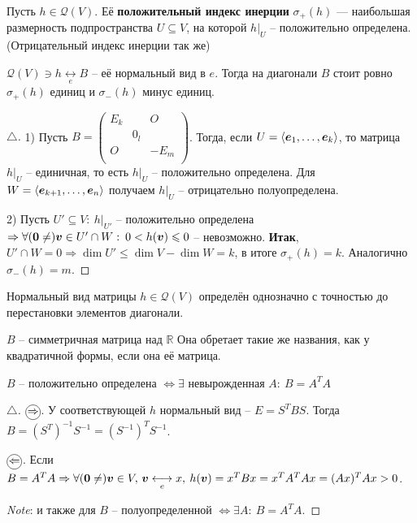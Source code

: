 \begin{to_def} 
	Пусть $h \in \mathcal{Q}(V)$. Её \textbf{положительный индекс инерции} $\sigma_+(h)$  --- наибольшая размерность подпространства $U\subseteq V$, на которой $h \big|_U$ -- положительно определена. (Отрицательный индекс инерции так же)
\end{to_def}

\begin{to_thr} 
	$\mathcal{Q}(V) \ni h \underset{e}{\longleftrightarrow} B$ -- её нормальный вид в $e$. Тогда на диагонали $B$ стоит ровно $\sigma_+(h)$ единиц и $\sigma_-(h)$ минус единиц. 
\end{to_thr}

\begin{proof}[$\triangle$]
	1) Пусть $B = 
	\begin{pmatrix}
	E_k&&O\\
	&0_l&\\
	O&&-E_m\\	
	\end{pmatrix}$.
	Тогда, если $U = \langle \mbox{\boldmath $e$}_1,\ldots,\mbox{\boldmath $e$}_k\rangle$, то матрица $h \big|_U$ -- единичная, то есть $h \big|_U$ -- положительно определена. Для $W = \langle \mbox{\boldmath $e$}_{k+1},\ldots,\mbox{\boldmath $e$}_n\rangle$ получаем $h\big|_U$ -- отрицательно полуопределена.

	2) Пусть $U' \subseteq V: \: h\big|_{U'}$ -- положительно определена $\Rightarrow \forall (\mbox{\boldmath $0$} \neq) \mbox{\boldmath $v$} \in U' \cap W: \: 0 < h(\mbox{\boldmath $v$}) \leqslant 0$ -- невозможно.
	 \textbf{Итак}, $U' \cap W = 0 \Rightarrow \dim U' \leq \dim V - \dim W = k$, в итоге $\sigma_+(h) = k$.
	 Аналогично $\sigma_-(h) = m$.
\end{proof}

\begin{to_con}
	Нормальный вид матрицы $h\in \mathcal{Q}(V)$ определён однозначно с точностью до перестановки элементов диагонали.
\end{to_con}

\begin{to_def} 
	$B$ -- симметричная матрица над $\mathbb{R}$ Она обретает такие же названия, как у квадратичной формы, если она её матрица.

	$B$ -- положительно определена $\Leftrightarrow \exists$ невырожденная $A:\: B = A^T A$
\end{to_def}

\begin{proof}[$\triangle$]
	$\encircled{\Rightarrow}$. У соответствующей $h$ нормальный вид -- $E = S^T B S$. Тогда $B = (S^T)^{-1} S^{-1} = (S^{-1})^{T} S^{-1}$.

	$\encircled{\Leftarrow}$. Если $B = A^T A \Rightarrow \forall(\mbox{\boldmath $0$} \neq)\mbox{\boldmath $v$} \in V, \, \mbox{\boldmath $v$} \underset{e}{\longleftrightarrow} x, \: h(\mbox{\boldmath $v$}) = x^T B x = x^T A^T A x = (A x)^T A x > 0$.

	\textit{Note}: и также для $B$ -- полуопределенной $\Leftrightarrow \exists A:\: B = A^T A$.
\end{proof} 

